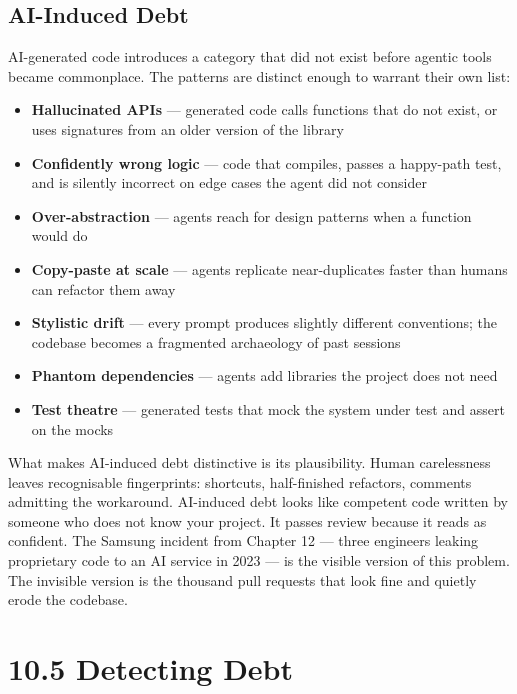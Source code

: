 \documentclass[11pt,a4paper]{book}
\begin{document}
\subsection{AI-Induced Debt}

AI-generated code introduces a category that did not exist before agentic tools became commonplace. The patterns are distinct enough to warrant their own list:

\begin{itemize}
  \item \textbf{Hallucinated APIs} --- generated code calls functions that do not exist, or uses signatures from an older version of the library
  \item \textbf{Confidently wrong logic} --- code that compiles, passes a happy-path test, and is silently incorrect on edge cases the agent did not consider
  \item \textbf{Over-abstraction} --- agents reach for design patterns when a function would do
  \item \textbf{Copy-paste at scale} --- agents replicate near-duplicates faster than humans can refactor them away
  \item \textbf{Stylistic drift} --- every prompt produces slightly different conventions; the codebase becomes a fragmented archaeology of past sessions
  \item \textbf{Phantom dependencies} --- agents add libraries the project does not need
  \item \textbf{Test theatre} --- generated tests that mock the system under test and assert on the mocks
\end{itemize}

What makes AI-induced debt distinctive is its plausibility. Human carelessness leaves recognisable fingerprints: shortcuts, half-finished refactors, comments admitting the workaround. AI-induced debt looks like competent code written by someone who does not know your project. It passes review because it reads as confident. The Samsung incident from Chapter 12 --- three engineers leaking proprietary code to an AI service in 2023 --- is the visible version of this problem. The invisible version is the thousand pull requests that look fine and quietly erode the codebase.

\medskip

\section{10.5 Detecting Debt}
\end{document}
